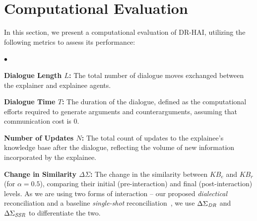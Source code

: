 \documentclass{ecai}
\newcommand{\squishlist}{
\begin{list}{$\bullet$}{ 
    \setlength{\itemsep}{1pt}
    \setlength{\parsep}{0pt}
    \setlength{\topsep}{1.5pt}
    \setlength{\partopsep}{0pt}
    \setlength{\leftmargin}{1em}
    \setlength{\labelwidth}{1em}
    \setlength{\labelsep}{0.5em} } }
\newcommand{\squishend}{\end{list}  }
\begin{document}
\section{Computational Evaluation}
\label{comp-eval}
In this section, we present a computational evaluation of DR-HAI, utilizing the following metrics to assess its performance:



\squishlist
\item \textbf{Dialogue Length $L$:} The total number of dialogue moves exchanged between the explainer and explainee agents.
\item \textbf{Dialogue Time $T$:} The duration of the dialogue, defined as the computational efforts required to generate arguments and counterarguments, assuming that communication cost is $0$.

\item \textbf{Number of Updates $N$:} The total count of updates to the explainee's knowledge base after the dialogue, reflecting the volume of new information incorporated by the explainee.


\item \textbf{Change in Similarity $\Delta \Sigma$:} The change in the similarity between $KB_e$ and $KB_r$ (for $\alpha =0.5$), comparing their initial (pre-interaction) and final (post-interaction) levels. %
As we are using two forms of interaction -- our proposed \emph{dialectical} reconciliation and a baseline \emph{single-shot} reconciliation~\cite{vas21}, we use $\Delta \Sigma_{\text{\emph{DR}}}$ and $\Delta \Sigma_{\text{\emph{SSR}}}$ to differentiate the two.
\squishend
\end{document}
